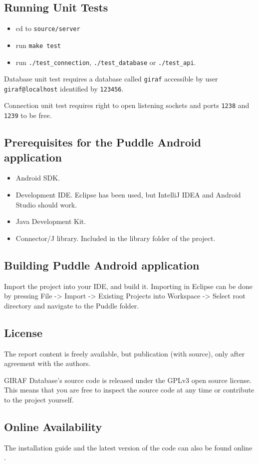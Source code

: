 \subsection{Running Unit Tests}
\begin{itemize}
\item cd to \lstinline|source/server|
\item run \lstinline|make test|
\item run \lstinline|./test_connection|, \lstinline|./test_database| or 
\lstinline|./test_api|.
\end{itemize}
Database unit test requires a database called \lstinline|giraf| accessible by user \lstinline|giraf@localhost| identified by \lstinline|123456|.

Connection unit test requires right to open listening sockets and ports \lstinline|1238| and \lstinline|1239| to be free.

\subsection{Prerequisites for the Puddle Android application}
\begin{itemize}
\item Android SDK.
\item Development IDE. Eclipse has been used, but IntelliJ IDEA and Android Studio should work.
\item Java Development Kit.
\item Connector/J library. Included in the library folder of the project.
\end{itemize}

\subsection{Building Puddle Android application}
Import the project into your IDE, and build it. Importing in Eclipse can be done by pressing File -> Import -> Existing Projects into Workspace -> Select root directory and navigate to the Puddle folder.

\subsection{License}
The report content is freely available, but publication (with source), only after agreement with the authors.

GIRAF Database's source code is released under the GPLv3 \cite{GNUlicense} open source license. This means that you are free to inspect the source code at any time or contribute to the project yourself.

\subsection*{Online Availability} The installation guide and the latest version of the code can also be found online \cite{install}.
